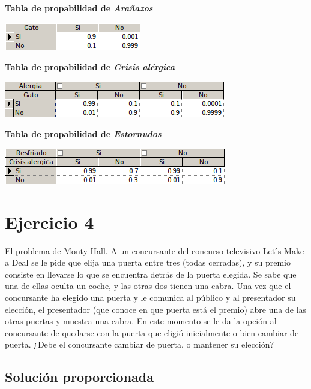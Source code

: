 \documentclass{article}
\begin{document}
\textbf{Tabla de propabilidad de \textit{Arañazos}}

\begin{center}
\includegraphics[scale=0.5]{Gato.png}
\end{center}

\textbf{Tabla de propabilidad de \textit{Crisis alérgica}}

\begin{center}
\includegraphics[scale=0.5]{Crisis.png}
\end{center}

\textbf{Tabla de propabilidad de \textit{Estornudos}}

\begin{center}
\includegraphics[scale=0.5]{Estornudos.png}
\end{center}

\section{Ejercicio 4}

El problema de Monty Hall. A un concursante del concurso televisivo Let ́s Make a Deal se le pide que elija una puerta entre tres (todas cerradas), y su premio consiste en llevarse lo que se encuentra detrás de la puerta elegida. Se sabe que una de ellas oculta un coche, y las otras dos tienen una cabra. Una vez que el concursante ha elegido una puerta y le comunica al público y al presentador su elección, el presentador (que conoce en que puerta está el premio) abre una de las otras puertas y muestra una cabra. En este momento se le da la opción al concursante de quedarse con la puerta que eligió inicialmente o bien cambiar de puerta. ¿Debe el concursante cambiar de puerta, o mantener su elección?

\subsection{Solución proporcionada}
\end{document}
